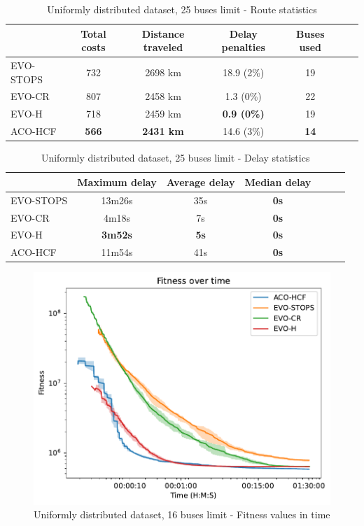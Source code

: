 \begin{table}
    \centering
    \begin{tabular}{lcccccc}
         & Total costs & Distance traveled & Delay penalties & Buses used \\
         \hline
         EVO-STOPS & 732 & 2698 km & 18.9 (2\%) & 19 \\
         EVO-CR & 807 & 2458 km & 1.3 (0\%) & 22 \\
         EVO-H & 718 & 2459 km & \textbf{0.9 (0\%)} & 19 \\
         ACO-HCF & \textbf{566} & \textbf{2431 km} & 14.6 (3\%) & \textbf{14} \\
    \end{tabular}
    \caption{Uniformly distributed dataset, 25 buses limit - Route statistics}
    \label{tab:exp_random_25_route_stats}
\end{table}

\begin{table}
    \centering
    \begin{tabular}{lcccccc}
         &  Maximum delay & Average delay & Median delay \\
         \hline
         EVO-STOPS & 13m26s & 35s & \textbf{0s} \\
         EVO-CR & 4m18s & 7s & \textbf{0s} \\
         EVO-H & \textbf{3m52s} & \textbf{5s} & \textbf{0s} \\
         ACO-HCF & 11m54s & 41s & \textbf{0s} \\
    \end{tabular}
    \caption{Uniformly distributed dataset, 25 buses limit - Delay statistics}
    \label{tab:exp_random_25_delay_stats}
\end{table}

\clearpage

\clearpage

\begin{figure}
    \centering
    \includegraphics[width=1\linewidth]
    {img/exp_random_16b_100_time.pdf}
    \caption{Uniformly distributed dataset, 16 buses limit - Fitness values in time}
    \label{fig:exp_random_16}
\end{figure}

